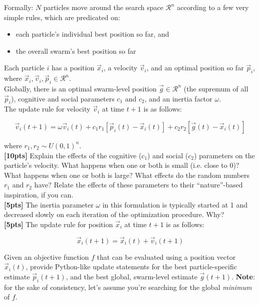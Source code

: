 \documentclass[paper=a4, fontsize=11pt]{scrartcl} %
\numberwithin{figure}{section} %
\numberwithin{table}{section} %
\begin{document}
Formally: $N$ particles move around the search space $\mathcal{R}^n$ according to a few very simple rules, which are predicated on:
\begin{itemize}
	\item each particle's individual best position so far, and 
	\item the overall swarm's best position so far
\end{itemize}

Each particle $i$ has a position $\vec{x}_i$, a velocity $\vec{v}_i$, and an optimal position so far $\vec{p}_i$, where $\vec{x}_i, \vec{v}_i, \vec{p}_i \in \mathcal{R}^n$. \\

Globally, there is an optimal swarm-level position $\vec{g} \in \mathcal{R}^n$ (the supremum of all $\vec{p}_i$), cognitive and social parameters $c_1$ and $c_2$, and an inertia factor $\omega$. \\

The update rule for velocity $\vec{v}_i$ at time $t + 1$ is as follows:

$$
\vec{v}_i(t + 1) = \omega \vec{v}_i(t) + c_1 r_1 \left[ \vec{p}_i(t) - \vec{x}_i(t) \right] + c_2 r_2 \left[ \vec{g}(t) - \vec{x}_i(t) \right]
$$

where $r_1, r_2 \sim U(0, 1)^n$. \\

\textbf{[10pts]} Explain the effects of the cognitive ($c_1$) and social ($c_2$) parameters on the particle's velocity. What happens when one or both is small (i.e. close to 0)? What happens when one or both is large? What effects do the random numbers $r_1$ and $r_2$ have? Relate the effects of these parameters to their ``nature''-based inspiration, if you can. \\

\textbf{[5pts]} The inertia parameter $\omega$ in this formulation is typically started at 1 and decreased slowly on each iteration of the optimization procedure. Why? \\

\textbf{[5pts]} The update rule for position $\vec{x}_i$ at time $t + 1$ is as follows:

$$
\vec{x}_i(t + 1) = \vec{x}_i(t) + \vec{v}_i(t + 1)
$$

Given an objective function $f$ that can be evaluated using a position vector $\vec{x}_i(t)$, provide Python-like update statements for the best particle-specific estimate $\vec{p}_i(t + 1)$, and the best global, swarm-level estimate $\vec{g}(t + 1)$. \textbf{Note}: for the sake of consistency, let's assume you're searching for the global \emph{minimum} of $f$. \\
\end{document}
